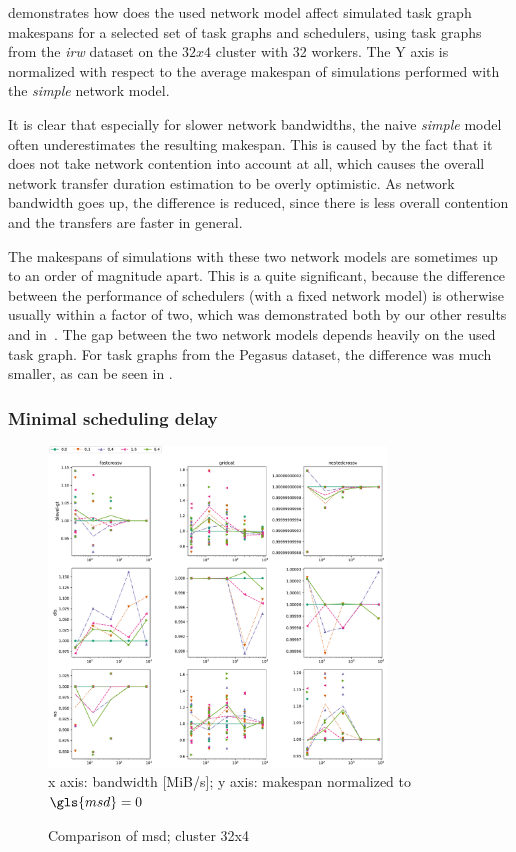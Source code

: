  demonstrates how does the used network model affect simulated task
graph makespans for a selected set of task graphs and schedulers, using task graphs from the
\emph{irw} dataset on the $32x4$ cluster with 32 workers. The Y axis
is normalized with respect to the average makespan of simulations performed with the
\emph{simple} network model.

It is clear that especially for slower network bandwidths, the naive \emph{simple} model
often underestimates the resulting makespan. This is caused by the fact that it does not take
network contention into account at all, which causes the overall network transfer duration
estimation to be overly optimistic. As network bandwidth goes up, the difference is reduced, since
there is less overall contention and the transfers are faster in general.

The makespans of simulations with these two network models are sometimes up to an order of
magnitude apart. This is a quite significant, because the difference between the performance of
schedulers (with a fixed network model) is otherwise usually within a factor of two, which was
demonstrated both by our other results and in~\cite{wang2018list}. The gap between the two
network models depends heavily on the used task graph. For task graphs from the Pegasus dataset,
the difference was much smaller, as can be seen in .

\subsubsection*{Minimal scheduling delay}

\begin{figure}
	\caption{Comparison of \gls{msd}; cluster 32x4}
	\label{fig:estee-chart-irw-msd}
	\centering
	\includegraphics[width=0.8\textwidth]{imgs/estee/charts/irw-32x4-schedtime-score}\\
	{\small x axis: bandwidth [MiB/s]; y axis: makespan normalized to
	$\gls{msd}=0$}
\end{figure}

